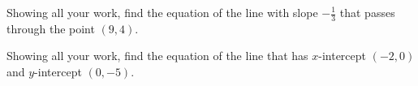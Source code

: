\documentclass[11pt,letterpaper]{article}
\begin{document}
\newpage



 Showing all your work, find the equation of the line with slope $-\frac{1}{3}$ that passes through the point $(9, 4)$. 



\newpage



 Showing all your work, find the equation of the line that has $x$-intercept $(-2, 0)$ and $y$-intercept $(0, -5)$. 
\end{document}
